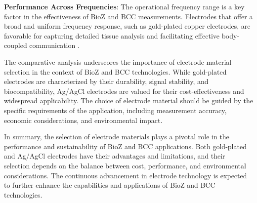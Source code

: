 { \textbf{Performance Across Frequencies}: The operational frequency range is a key factor in the effectiveness of BioZ and BCC measurements. Electrodes that offer a broad and uniform frequency response, such as gold-plated copper electrodes, are favorable for capturing detailed tissue analysis and facilitating effective body-coupled communication \cite{s23094251}.
    


The comparative analysis underscores the importance of electrode material selection in the context of BioZ and BCC technologies. While gold-plated electrodes are characterized by their durability, signal stability, and biocompatibility, Ag/AgCl electrodes are valued for their cost-effectiveness and widespread applicability. The choice of electrode material should be guided by the specific requirements of the application, including measurement accuracy, economic considerations, and environmental impact.

In summary, the selection of electrode materials plays a pivotal role in the performance and sustainability of BioZ and BCC applications. Both gold-plated and Ag/AgCl electrodes have their advantages and limitations, and their selection depends on the balance between cost, performance, and environmental considerations. The continuous advancement in electrode technology is expected to further enhance the capabilities and applications of BioZ and BCC technologies.

}

